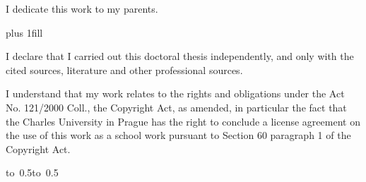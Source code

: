 \newpage


\openright

\noindent
I dedicate this work to my parents.

\newpage


\vglue 0pt plus 1fill

\noindent
I declare that I carried out this doctoral thesis independently, and only with the cited
sources, literature and other professional sources.

\medskip\noindent
I understand that my work relates to the rights and obligations under the Act No.
121/2000 Coll., the Copyright Act, as amended, in particular the fact that the Charles
University in Prague has the right to conclude a license agreement on the use of this
work as a school work pursuant to Section 60 paragraph 1 of the Copyright Act.

\vspace{10mm}

\hbox{\hbox to 0.5\hbox to 0.5}

\vspace{20mm}
\newpage


